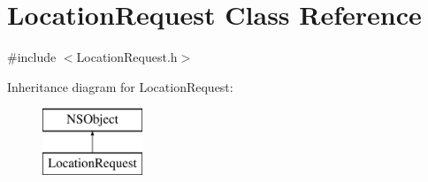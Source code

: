 \hypertarget{interface_location_request}{
\section{\-Location\-Request \-Class \-Reference}
\label{interface_location_request}
}


{\ttfamily \#include $<$\-Location\-Request.\-h$>$}

\-Inheritance diagram for \-Location\-Request\-:\begin{figure}[H]
\begin{center}
\leavevmode
\includegraphics[height=2.000000cm]{interface_location_request}
\end{center}
\end{figure}
